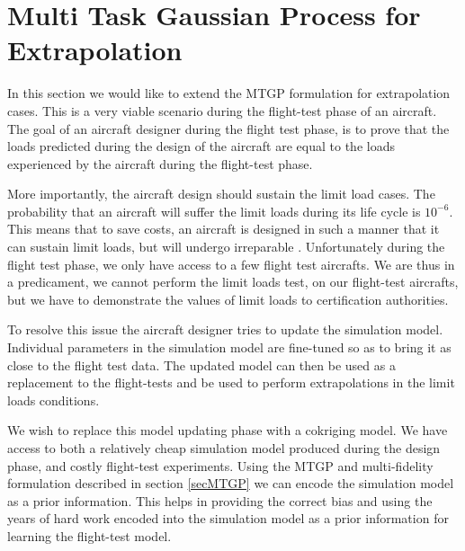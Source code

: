 \section{Multi Task Gaussian Process for Extrapolation}\label{subsecMTGPExtrapolation}
In this section we would like to extend the MTGP formulation for extrapolation cases. This is a very viable scenario during the flight-test phase of an aircraft. The goal of an aircraft designer during the flight test phase, is to prove that the loads predicted during the design of the aircraft are equal to the loads experienced by the aircraft during the flight-test phase. 

More importantly, the aircraft design should sustain the limit load cases. The probability that an aircraft will suffer the limit loads during its life cycle is $10^{-6}$.  This means that to save costs, an aircraft is designed in such a manner that it can sustain limit loads, but will undergo irreparable \cite{de2016airworthiness}. Unfortunately during the flight test phase, we only have access to a few flight test aircrafts. We are thus in a predicament, we cannot perform the limit loads test, on our flight-test aircrafts, but we have to demonstrate the values of limit loads to certification authorities.

To resolve this issue the aircraft designer tries to update the simulation model. Individual parameters in the simulation model are fine-tuned so as to bring it as close to the flight test data. The updated model can then be used as a replacement to the flight-tests and be used to perform extrapolations in the limit loads conditions.

We wish to replace this model updating phase with a cokriging model. We have access to both a relatively cheap simulation model produced during the design phase, and costly  flight-test experiments. Using the MTGP and multi-fidelity formulation described in section \ref{secMTGP} we can encode the simulation model as a prior information. This helps in providing the correct bias and using the years of hard work encoded into the simulation model as a prior information for learning the flight-test model.


